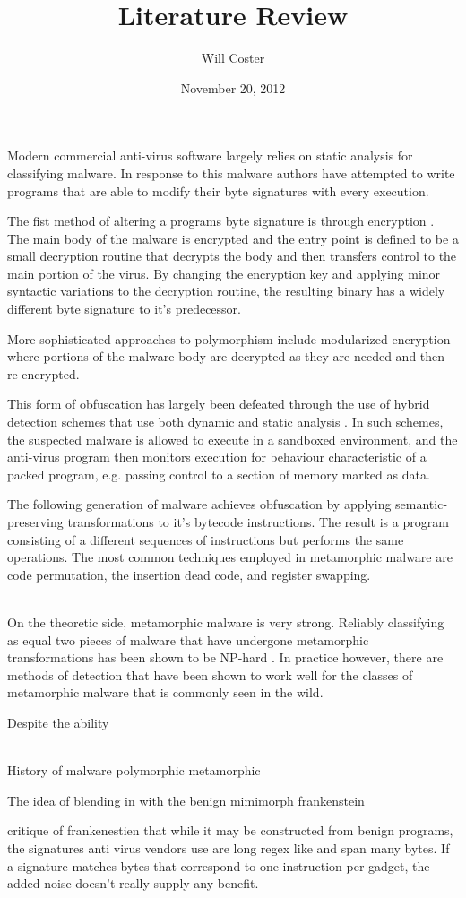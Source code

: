 \documentclass[finalcopy,short]{srpaper}
\title{Literature Review}
\author{Will Coster}
\date{November 20, 2012}
\begin{document}
  \frontmatter
  \nocite{*}

  Modern commercial anti-virus software largely relies on static analysis for
  classifying malware. In response to this malware authors have attempted to
  write programs that are able to modify their byte signatures with every
  execution.
  
  The fist method of altering a programs byte signature is through encryption
  \cite{simile}.  The main body of the malware is encrypted and the entry point
  is defined to be a small decryption routine that decrypts the body and then
  transfers control to the main portion of the virus. By changing the encryption
  key and applying minor syntactic variations to the decryption routine, the
  resulting binary has a widely different byte signature to it's predecessor.

  More sophisticated approaches to polymorphism include modularized encryption
  where portions of the malware body are decrypted as they are needed and then
  re-encrypted.

  This form of obfuscation has largely been defeated through the use of hybrid
  detection schemes that use both dynamic and static analysis \cite{polyunpack}.
  In such schemes, the suspected malware is allowed to execute in a sandboxed
  environment, and the anti-virus program then monitors execution for behaviour
  characteristic of a packed program, e.g. passing control to a section of
  memory marked as data.

  The following generation of malware achieves obfuscation by applying
  semantic-preserving transformations to it's bytecode instructions. The result
  is a program consisting of a different sequences of instructions but performs
  the same operations. The most common techniques employed in metamorphic
  malware are code permutation, the insertion dead code, and register swapping.

  ~\\

  On the theoretic side, metamorphic malware is very strong. Reliably
  classifying as equal two pieces of malware that have undergone metamorphic
  transformations has been shown to be NP-hard \cite{npcomplete}. In practice
  however, there are methods of detection that have been shown to work well for
  the classes of metamorphic malware that is commonly seen in the wild.

  Despite the ability \cite{hmm_detect}


  ~\\

  History of malware
  polymorphic
  metamorphic

The idea of blending in with the benign
  mimimorph
  frankenstein

critique of frankenestien that while it may be constructed from benign programs,
the signatures anti virus vendors use are long regex like and span many bytes.
If a signature matches bytes that correspond to one instruction per-gadget, the
added noise doesn't really supply any benefit.



\end{document}

